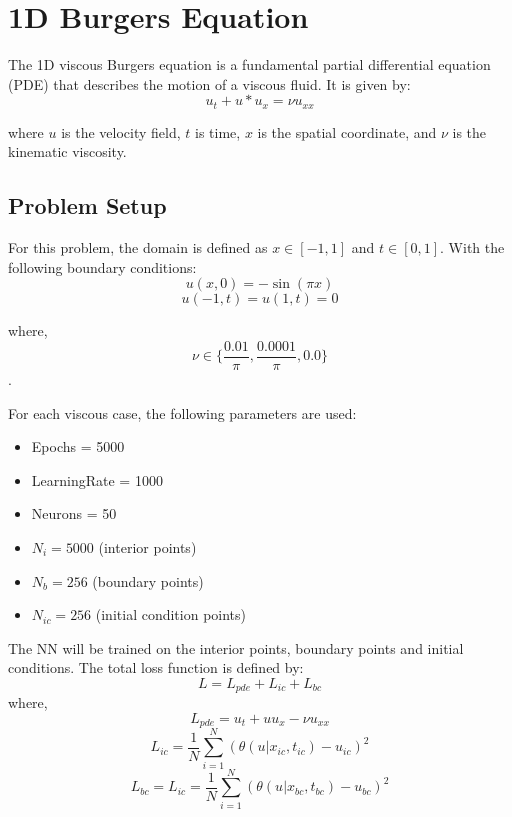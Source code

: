 \documentclass[11pt]{article}
\begin{document}
\section{1D Burgers Equation}
The 1D viscous Burgers equation is a fundamental partial differential equation (PDE) that describes the motion of a viscous fluid. It is given by:
\begin{equation}
    u_t + u*u_x = \nu u_{xx}
\end{equation}

where $u$ is the velocity field, $t$ is time, $x$ is the spatial coordinate, and $\nu$ is the kinematic viscosity.

\subsection{Problem Setup}
For this problem, the domain is defined as $x \in [-1, 1]$ and $t \in [0, 1]$. With the following boundary conditions:
\begin{equation}
    u(x, 0) = -\sin(\pi x)
\end{equation}
\begin{equation}
    u(-1, t) = u(1,t) = 0
\end{equation}
 
where,
\[
\nu \in \lbrace \frac{0.01}{\pi}, \frac{0.0001}{\pi}, 0.0 \rbrace
\].

For each viscous case, the following parameters are used:
\begin{itemize}
    \item Epochs = 5000
    \item LearningRate = 1000
    \item Neurons = 50
    \item $N_{i}  = 5000$ (interior points)
    \item $N_{b}  = 256$  (boundary points)
    \item $N_{ic} = 256$  (initial condition points)
\end{itemize}

The NN will be trained on the interior points, boundary points and initial conditions. The total loss function is defined by:
\begin{equation}
    L = L_{pde} + L_{ic} + L_{bc}
\end{equation}
where,
\begin{equation}
    L_{pde} = u_t + u u_x - \nu u_{xx}
\end{equation}
\begin{equation}
    L_{ic} = \frac{1}{N} \sum_{i=1}^{N} (\theta(u|x_{ic}, t_{ic})-u_{ic})^2
\end{equation}
\begin{equation}
    L_{bc} = L_{ic} = \frac{1}{N} \sum_{i=1}^{N} (\theta(u|x_{bc}, t_{bc})-u_{bc})^2
\end{equation}
\end{document}
